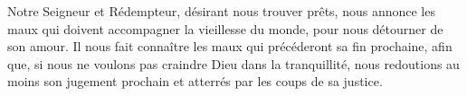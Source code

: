 Notre Seigneur et Rédempteur, désirant nous trouver prêts,
	nous annonce les maux qui doivent accompagner la vieillesse du monde,
	pour nous détourner de son amour.
Il nous fait connaître les maux qui précéderont sa fin prochaine,
	afin que, si nous ne voulons pas craindre Dieu dans la tranquillité,
	nous redoutions au moins son jugement prochain
	et atterrés par les coups de sa justice.
